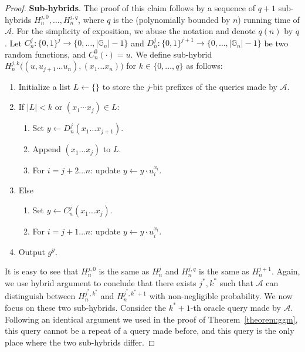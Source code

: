 \documentclass[12pt]{tufte-book}
\begin{document}
\begin{proof}
    \noindent \textbf{Sub-hybrids}. The proof of this claim follows by a sequence of $q+1$ sub-hybrids $H_n^{j, 0}, \dots, H_n^{j, q}$, where $q$ is the (polynomially bounded by $n$) running time of $\mathcal{A}$. For the simplicity of exposition, we abuse the notation and denote $q(n)$ by $q$. Let $C_n^j: \{0, 1\}^j \to \{0, \dots, |\mathbb{G}_n|-1\}$ and $D_n^j: \{0, 1\}^{j+1} \to \{0, \dots, |\mathbb{G}_n|-1\}$ be two random functions, and $C_n^0(\cdot) = u$. We define sub-hybrid $H_n^{j, k}\big((u, u_{j+1}\ldots u_n),(x_1\dots x_n)\big)$ for $k \in \{0, \dots, q\}$ as follows:
    \begin{enumerate}
        \item Initialize a list $L \gets \{\}$ to store the $j$-bit prefixes of the queries made by $\mathcal{A}$.
        \item If $|L|<k$ or $(x_1\cdots x_j) \in L$:
              \begin{enumerate}
                  \item Set $y \gets D^j_n(x_1\dots x_{j+1})$.
                  \item Append $(x_1\dots x_j)$ to $L$.
                  \item For $i = j+2 \dots n$: update $y \gets y \cdot u_i^{x_i}$.
              \end{enumerate}
        \item Else
              \begin{enumerate}
                  \item Set $y \gets C^j_n(x_1\dots x_j)$.
                  \item For $i = j+1 \dots n$: update $y \gets y \cdot u_i^{x_i}$.
              \end{enumerate}
        \item Output $g^y$.
    \end{enumerate}

    It is easy to see that $H_n^{j, 0}$ is the same as $H_n^j$ and $H_n^{j, q}$ is the same as $H_n^{j+1}$.
    Again, we use hybrid argument to conclude that there exists $j^*, k^*$ such that $\mathcal{A}$ can distinguish between $H_n^{j^*, k^*}$ and $H_n^{j^*, k^*+1}$ with non-negligible probability. We now focus on these two sub-hybrids. Consider the $k^*+1$-th oracle query made by $\mathcal{A}$. Following an identical argument we used in the proof of Theorem~\ref{theorem:ggm}, this query cannot be a repeat of a query made before, and this query is the only place where the two sub-hybrids differ.\smallskip


\end{proof}
\end{document}
